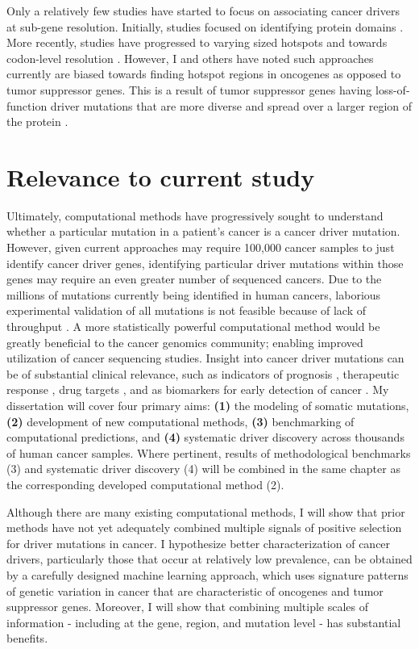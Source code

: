 Only a relatively few studies have started to focus on associating cancer drivers at sub-gene resolution. Initially, studies focused on identifying protein domains \cite{RN46, RN110}. More recently, studies have progressed to varying sized hotspots and towards codon-level resolution \cite{RN166, RN16, RN55}. However, I and others have noted such approaches currently are biased towards finding hotspot regions in oncogenes as opposed to tumor suppressor genes. This is a result of tumor suppressor genes having loss-of-function driver mutations that are more diverse and spread over a larger region of the protein \cite{RN60}. 

\section{Relevance to current study}
\label{sec:section}

Ultimately, computational methods have progressively sought to understand whether a particular mutation in a patient's cancer is a cancer driver mutation. However, given current approaches may require 100,000 cancer samples to just identify cancer driver genes, identifying particular driver mutations within those genes may require an even greater number of sequenced cancers. Due to the millions of mutations currently being identified in human cancers, laborious experimental validation of all mutations is not feasible because of lack of throughput \cite{RN57, RN61}. A more statistically powerful computational method would be greatly beneficial to the cancer genomics community; enabling improved utilization of cancer sequencing studies. Insight into cancer driver mutations can be of substantial clinical relevance, such as indicators of prognosis \cite{RN6, RN159}, therapeutic response \cite{RN58}, drug targets \cite{RN104}, and as biomarkers for early detection of cancer \cite{RN59}. My dissertation will cover four primary aims: \textbf{(1)} the modeling of somatic mutations, \textbf{(2)} development of new computational methods, \textbf{(3)} benchmarking of computational predictions, and \textbf{(4)} systematic driver discovery across thousands of human cancer samples. Where pertinent, results of methodological benchmarks (3) and systematic driver discovery (4) will be combined in the same chapter as the corresponding developed computational method (2).

Although there are many existing computational methods, I will show that prior methods have not yet adequately combined multiple signals of positive selection for driver mutations in cancer. I hypothesize better characterization of cancer drivers, particularly those that occur at relatively low prevalence, can be obtained by a carefully designed machine learning approach, which uses signature patterns of genetic variation in cancer that are characteristic of oncogenes and tumor suppressor genes. Moreover, I will show that combining multiple scales of information - including at the gene, region, and mutation level - has substantial benefits.

